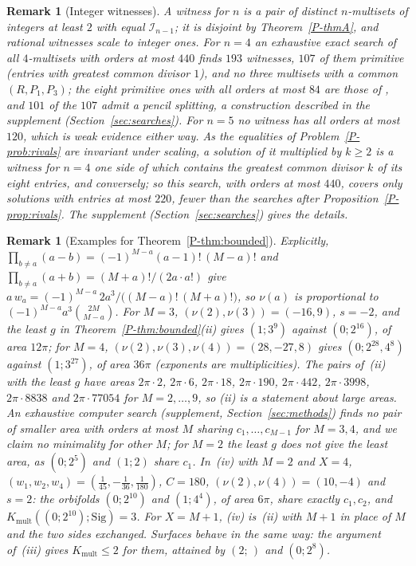 \documentclass[pdflatex,sn-mathphys-num]{sn-jnl}
\newcommand{\cI}{\mathcal{I}}
\newcommand{\pref}[1]{\ref*{P-#1}}%
\newcommand{\Kmult}{K_{\mathrm{mult}}}
\newcommand{\Sig}{\mathrm{Sig}}
\theoremstyle{thmstyleone}%
\theoremstyle{thmstylethree}%
\newtheorem{remark}[proposition]{Remark}%
\providecommand{\Sig}{\mathrm{Sig}}
\providecommand{\Kmult}{K_{\mathrm{mult}}}
\providecommand{\cI}{\mathcal{I}}
\begin{document}
\begin{remark}[Integer witnesses]\label{rem:witnesses}
A \emph{witness} for $n$ is a pair of distinct $n$-multisets of integers at least $2$ with equal $\cI_{n-1}$; it is disjoint by Theorem~\pref{thmA}, and rational witnesses scale to integer ones. For $n=4$ an exhaustive exact search of all $4$-multisets with orders at most $440$ finds $193$ witnesses, $107$ of them primitive (entries with greatest common divisor $1$), and no three multisets with a common $(R,P_1,P_3)$; the eight primitive ones with all orders at most $84$ are those of \cite[(A.685)--(A.692)]{chen2025survey}, and $101$ of the $107$ admit a pencil splitting, a construction described in the supplement (Section~\ref{sec:searches}). For $n=5$ no witness has all orders at most $120$, which is weak evidence either way. As the equalities of Problem~\pref{prob:rivals} are invariant under scaling, a solution of it multiplied by $k\ge2$ is a witness for $n=4$ one side of which contains the greatest common divisor $k$ of its eight entries, and conversely; so this search, with orders at most $440$, covers only solutions with entries at most $220$, fewer than the searches after Proposition~\pref{prop:rivals}. The supplement (Section~\ref{sec:searches}) gives the details.
\end{remark}

\begin{remark}[Examples for Theorem~\pref{thm:bounded}]\label{rem:boundedex}
Explicitly, $\prod_{b\ne a}(a-b)=(-1)^{M-a}(a-1)!\,(M-a)!$ and $\prod_{b\ne a}(a+b)=(M+a)!/(2a\cdot a!)$ give $a\,w_a=(-1)^{M-a}\,2a^3/\big((M-a)!\,(M+a)!\big)$, so $\nu(a)$ is proportional to $(-1)^{M-a}a^3\binom{2M}{M-a}$. For $M=3$, $(\nu(2),\nu(3))=(-16,9)$, $s=-2$, and the least $g$ in Theorem~\pref{thm:bounded}(ii) gives $(1;3^9)$ against $(0;2^{16})$, of area $12\pi$; for $M=4$, $(\nu(2),\nu(3),\nu(4))=(28,-27,8)$ gives $(0;2^{28},4^8)$ against $(1;3^{27})$, of area $36\pi$ (exponents are multiplicities). The pairs of~(ii) with the least $g$ have areas $2\pi\cdot2$, $2\pi\cdot6$, $2\pi\cdot18$, $2\pi\cdot190$, $2\pi\cdot442$, $2\pi\cdot3998$, $2\pi\cdot8838$ and $2\pi\cdot77054$ for $M=2,\dots,9$, so (ii) is a statement about large areas. An exhaustive computer search (supplement, Section~\ref{sec:methods}) finds no pair of smaller area with orders at most $M$ sharing $c_1,\dots,c_{M-1}$ for $M=3,4$, and we claim no minimality for other $M$; for $M=2$ the least $g$ does not give the least area, as $(0;2^5)$ and $(1;2)$ share $c_1$. In~(iv) with $M=2$ and $X=4$, $(w_1,w_2,w_4)=(\frac1{45},-\frac1{36},\frac1{180})$, $C=180$, $(\nu(2),\nu(4))=(10,-4)$ and $s=2$: the orbifolds $(0;2^{10})$ and $(1;4^4)$, of area $6\pi$, share exactly $c_1,c_2$, and $\Kmult((0;2^{10});\Sig)=3$. For $X=M+1$, (iv) is~(ii) with $M+1$ in place of $M$ and the two sides exchanged. Surfaces behave in the same way: the argument of~(iii) gives $\Kmult\le2$ for them, attained by $(2;\,)$ and $(0;2^8)$.
\end{remark}
\end{document}
